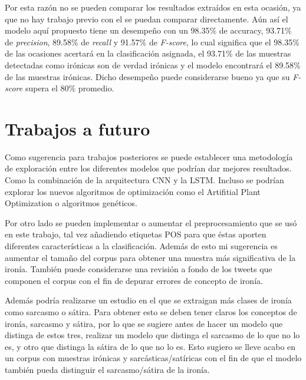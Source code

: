 \par Por esta razón no se pueden comparar los resultados extraídos en esta ocasión, ya que no hay trabajo previo con el se puedan comparar directamente. Aún así el modelo aquí propuesto  tiene un desempeño con un 98.35\% de accuracy, 93.71\% de \textit{precision}, 89.58\% de \textit{recall} y 91.57\% de \textit{F-score}, lo cual significa que el 98.35\% de las ocasiones acertará en la clasificación asignada, el 93.71\% de las muestras detectadas como irónicas son de verdad irónicas y el modelo encontrará el 89.58\% de las muestras irónicas. Dicho desempeño puede considerarse bueno ya que su \textit{F-score} supera el 80\% promedio.

\section{Trabajos a futuro}

\par Como sugerencia para trabajos posteriores se puede establecer una metodología de exploración entre los diferentes modelos que podrían dar mejores resultados. Como la combinación de la arquitectura CNN y la LSTM. Incluso se podrían explorar los nuevos algoritmos de optimización como el Artifitial Plant Optimization o algoritmos genéticos.

\par Por otro lado se pueden implementar o aumentar el preprocesamiento que se usó en este trabajo, tal vez añadiendo etiquetas POS para que éstas aporten diferentes características a la clasificación. Además de esto mi sugerencia es aumentar el tamaño del corpus para obtener una muestra más significativa de la ironía. También puede considerarse una revisión a fondo de los tweets que componen el corpus con el fin de depurar errores de concepto de ironía.

\par Además podría realizarse un estudio en el que se extraigan más clases de ironía como sarcasmo o sátira. Para obtener esto se deben tener claros los conceptos de ironía, sarcasmo y sátira, por lo que se sugiere antes de hacer un modelo que distinga de estos tres, realizar un modelo que distinga el sarcasmo de lo que no lo es, y otro que distinga la sátira de lo que no lo es. Esto sugiero se lleve acabo en un corpus con muestras irónicas y sarcásticas/satíricas con el fin de que el modelo también pueda distinguir el sarcasmo/sátira de la ironía.

